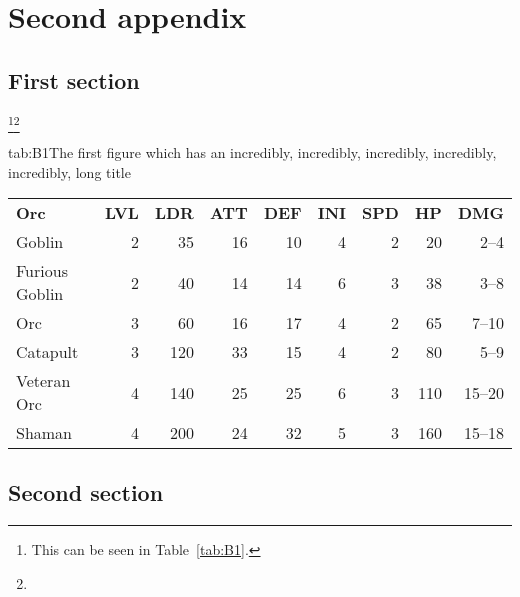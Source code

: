 \chapter{Second appendix}
\section{First section}
\lipsum[10-11]\footnote{This can be seen in Table~\ref{tab:B1}.}\footnote{\lipsum[12]}
\begin{singletable}{tab:B1}{The first figure which has an incredibly, incredibly, incredibly, incredibly, incredibly, long title}{\lipsum[13]}
  \begin{tabular}{lrrrrrrrr}
    \textbf{Orc} & \textbf{LVL} & \textbf{LDR} & \textbf{ATT} & \textbf{DEF} & \textbf{INI} & \textbf{SPD} & \textbf{HP} & \textbf{DMG} \\ \rule{0pt}{3ex}%
    Goblin         & 2 &  35 & 16 & 10 & 4 & 2 &  20 &  2--4  \\
    Furious Goblin & 2 &  40 & 14 & 14 & 6 & 3 &  38 &  3--8  \\
    Orc            & 3 &  60 & 16 & 17 & 4 & 2 &  65 &  7--10 \\ \rule{0pt}{3ex}%
    Catapult       & 3 & 120 & 33 & 15 & 4 & 2 &  80 &  5--9  \\
    Veteran Orc    & 4 & 140 & 25 & 25 & 6 & 3 & 110 & 15--20 \\
    Shaman         & 4 & 200 & 24 & 32 & 5 & 3 & 160 & 15--18 \\
  \end{tabular}
\end{singletable}
\section{Second section}
